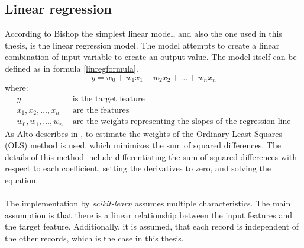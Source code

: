 \subsection{Linear regression}
According to Bishop \parencite{bishopML} the simplest linear model, and also the one used in this thesis, is the linear regression model. The model attempts to create a linear combination of input variable to create an output value. The model itself can be defined as in formula \ref{linregformula}. 
\begin{equation}\label{linregformula}
y = w_0 + w_1 x_1 + w_2 x_2 + \ldots + w_n x_n
\end{equation}
where:
\begin{align*}
y & \text{ is the target feature} \\
x_1, x_2, \ldots, x_n & \text{ are the features} \\
w_0, w_1, \ldots, w_n & \text{ are the weights representing the slopes of the regression line} 
\end{align*}
As Alto describes in \parencite{Understa37:online}, to estimate the weights of the Ordinary Least Squares (OLS) method is used, which minimizes the sum of squared differences. The details of this method include  differentiating the sum of squared differences with respect to each coefficient, setting the derivatives to zero, and solving the equation. 
\\\\
The implementation by \textit{scikit-learn} \parencite{11Linear83:online} assumes multiple characteristics. The main assumption is that there is a linear relationship between the input features and the target feature. Additionally, it is assumed, that each record is independent of the other records, which is the case in this thesis. 

